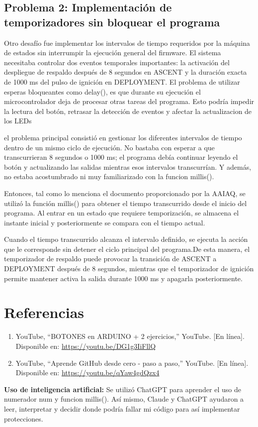 \documentclass[10pt,a4paper]{article}
\begin{document}
\subsection{Problema 2: Implementación de temporizadores sin bloquear el programa}

Otro desafío fue implementar los intervalos de tiempo requeridos por la máquina de estados sin interrumpir la ejecución general del firmware. El sistema necesitaba controlar dos eventos temporales importantes: la activación del despliegue de respaldo después de 8 segundos en ASCENT y la duración exacta de 1000 ms del pulso de ignición en DEPLOYMENT.
El problema de utilizar esperas bloqueantes  como delay(), es que durante su ejecución el microcontrolador deja de procesar otras tareas del programa. Esto podría impedir la lectura del botón, retrasar la detección de eventos y afectar la actualizacion de los LEDs

el problema principal consistió en gestionar los diferentes intervalos de tiempo dentro de un mismo ciclo de ejecución. No bastaba con esperar a que transcurrieran 8 segundos o 1000 ms; el programa debía continuar leyendo el botón y actualizando las salidas mientras esos intervalos transcurrían. Y además, no estaba acostumbrado ni muy familiarizado con la funcion millis().

Entonces, tal como lo menciona el documento proporcionado por la AAIAQ, se utilizó la función millis() para obtener el tiempo transcurrido desde el inicio del programa. Al entrar en un estado que requiere temporización, se almacena el instante inicial y posteriormente se compara con el tiempo actual.

Cuando el tiempo transcurrido alcanza el intervalo definido, se ejecuta la acción que le corresponde sin detener el ciclo principal del programa.De esta manera, el temporizador de respaldo puede provocar la transición de ASCENT a DEPLOYMENT después de 8 segundos, mientras que el temporizador de ignición permite mantener activa la salida durante 1000 ms y apagarla posteriormente.

\section{Referencias}

\begin{enumerate}
    \item [1] YouTube, “BOTONES en ARDUINO + 2 ejercicios,” YouTube. [En línea]. Disponible en:
    \url{https://youtu.be/DG1g3IiFllQ}
    \item [2] YouTube, “Aprende GitHub desde cero - paso a paso,” YouTube. [En línea]. Disponible en:
    \url{https://youtu.be/qYaw4gdQzx4}
\end{enumerate}

\textbf{Uso de inteligencia artificial:}
Se utilizó ChatGPT para aprender el uso de numerador num y funcion millis(). Así mismo, Claude y ChatGPT ayudaron a leer, interpretar y decidir donde podría fallar mi código para así implementar protecciones. 
\end{document}
